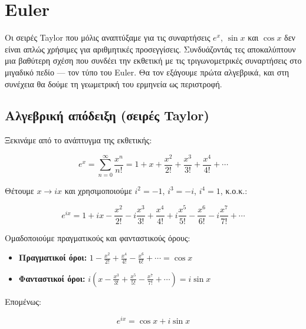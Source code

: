 \documentclass[a4paper, 11pt]{article}
\providecommand{\tightlist}{\setlength{\itemsep}{0pt}\setlength{\parskip}{0pt}}
\begin{document}
\section{Euler}\label{euler}

Οι σειρές Taylor που μόλις αναπτύξαμε για τις συναρτήσεις \(e^x\),
\(\sin x\) και \(\cos x\) δεν είναι απλώς χρήσιμες για αριθμητικές
προσεγγίσεις. Συνδυάζοντάς τες αποκαλύπτουν μια βαθύτερη σχέση που
συνδέει την εκθετική με τις τριγωνομετρικές συναρτήσεις στο μιγαδικό
πεδίο --- τον τύπο του Euler. Θα τον εξάγουμε πρώτα αλγεβρικά, και στη
συνέχεια θα δούμε τη γεωμετρική του ερμηνεία ως περιστροφή.

\subsection{Αλγεβρική απόδειξη (σειρές
Taylor)}\label{ux3b1ux3bbux3b3ux3b5ux3b2ux3c1ux3b9ux3baux3ae-ux3b1ux3c0ux3ccux3b4ux3b5ux3b9ux3beux3b7-ux3c3ux3b5ux3b9ux3c1ux3adux3c2-taylor}

Ξεκινάμε από το ανάπτυγμα της εκθετικής:

\[
e^{x} = \sum_{n=0}^{\infty} \frac{x^n}{n!} = 1 + x + \frac{x^2}{2!} + \frac{x^3}{3!} + \frac{x^4}{4!} + \cdots
\]

Θέτουμε \(x \to ix\) και χρησιμοποιούμε \(i^2 = -1\), \(i^3 = -i\),
\(i^4 = 1\), κ.ο.κ.:

\[
e^{ix} = 1 + ix - \frac{x^2}{2!} - i\frac{x^3}{3!} + \frac{x^4}{4!} + i\frac{x^5}{5!} - \frac{x^6}{6!} - i\frac{x^7}{7!} + \cdots
\]

Ομαδοποιούμε πραγματικούς και φανταστικούς όρους:

\begin{itemize}
\tightlist
\item
  \textbf{Πραγματικοί όροι:}
  \(1 - \frac{x^2}{2!} + \frac{x^4}{4!} - \frac{x^6}{6!} + \cdots = \cos x\)
\item
  \textbf{Φανταστικοί όροι:}
  \(i\left(x - \frac{x^3}{3!} + \frac{x^5}{5!} - \frac{x^7}{7!} + \cdots\right) = i\sin x\)
\end{itemize}

Επομένως:

\[
\boxed{e^{ix} = \cos x + i\sin x}
\]
\end{document}
